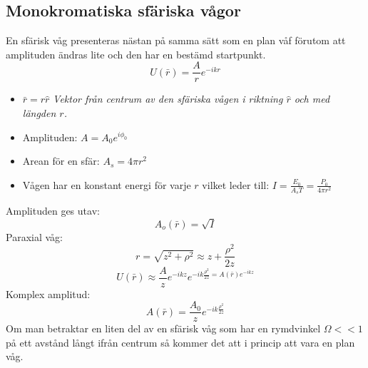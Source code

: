 \documentclass{article}
\begin{document}
  \newpage
  \subsection{Monokromatiska sfäriska vågor}
    En sfärisk våg presenteras nästan på samma sätt som en plan våf förutom att amplituden ändras lite och den har en bestämd startpunkt.
    \[
      U(\bar{r})=\frac{A}{r}e^{-ikr}
    \]
    \begin{itemize}
      \item $\bar{r}=r\hat{r}$ \quad\textit{Vektor från centrum av den sfäriska vågen i riktning $\hat{r}$ och med längden $r$.}
      \item Amplituden: $A = A_0e^{i\phi_0}$
      \item Arean för en sfär: $A_s=4\pi r^2$
      \item Vågen har en konstant energi för varje $r$ vilket leder till: $I=\frac{E_0}{A_sT}=\frac{P_0}{4\pi r^2}$
    \end{itemize}
    Amplituden ges utav:
    \[
    A_o(\bar{r})=\sqrt{I}
    \]
    Paraxial våg:
    \[
      r = \sqrt{z^2+\rho^2}\approx z+\frac{\rho^2}{2z}
    \]
    \[
      U(\bar{r})\approx \frac{A}{z}e^{-ikz}e^{-ik\frac{\rho^2}{2z}=A(\bar{r})e^{-ikz}}
    \]
    Komplex amplitud:
    \[
      A(\bar{r})=\frac{A_0}{z}e^{-ik\frac{\rho^2}{2z}}
    \]
    Om man betraktar en liten del av en sfärisk våg som har en rymdvinkel $\Omega<<1$ på ett avstånd långt ifrån centrum så kommer det att i princip att vara en plan våg.
\end{document}
